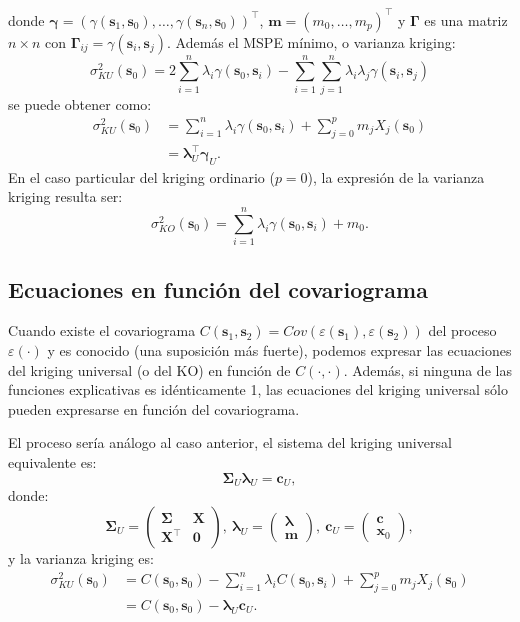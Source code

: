 \documentclass[
]{book}
\theoremstyle{break}
\theoremstyle{definition}
\theoremstyle{definition}
\theoremstyle{definition}
\theoremstyle{definition}
\theoremstyle{remark}
\begin{document}
donde \(\boldsymbol{\gamma}=\left( \gamma(\mathbf{s}_{1},\mathbf{s}_{0}), \ldots, \gamma(\mathbf{s}_{n} ,\mathbf{s}_{0})\right)^\top\), \(\mathbf{m}=\left(m_{0}, \ldots,m_{p} \right)^\top\) y \(\boldsymbol{\Gamma}\) es una matriz \(n\times n\) con \(\boldsymbol{\Gamma}_{ij} = \gamma(\mathbf{s}_{i}, \mathbf{s}_{j})\).
Además el MSPE mínimo, o varianza kriging:
\[\sigma_{KU}^{2} (\mathbf{s}_{0})=2\sum\limits_{i=1}^{n}\lambda_{i} 
\gamma(\mathbf{s}_{0},\mathbf{s}_{i}
)-\sum\limits_{i=1}^{n}\sum\limits_{j=1}^{n}\lambda_{i}  \lambda_{j}
\gamma(\mathbf{s}_{i},\mathbf{s}_{j} )\]
se puede obtener como:
\[\begin{aligned}
\sigma_{KU}^{2} (\mathbf{s}_{0})
& =\sum\limits_{i=1}^{n}\lambda_{i} \gamma(\mathbf{s}_{0},\mathbf{s}_{i})+\sum\limits_{j=0}^{p}m_{j} X_{j}
(\mathbf{s}_{0}) \\
& =\boldsymbol{\lambda}_{U}^\top \boldsymbol{\gamma}_{U}.
\end{aligned}\]
En el caso particular del kriging ordinario (\(p=0\)), la expresión de la varianza kriging resulta ser:
\[\sigma_{KO}^{2} (\mathbf{s}_{0})=\sum\limits_{i=1}^{n}\lambda_{i} 
\gamma(\mathbf{s}_{0},\mathbf{s}_{i})+m_{0}.\]

\subsection{Ecuaciones en función del covariograma}\label{ku-covariograma}

Cuando existe el covariograma \(C(\mathbf{s}_{1},\mathbf{s}_{2}) = Cov(\varepsilon(\mathbf{s}_{1}), \varepsilon(\mathbf{s}_{2}))\) del proceso \(\varepsilon(\cdot)\) y es conocido (una suposición más fuerte), podemos expresar las ecuaciones del kriging universal (o del KO) en función de \(C(\cdot,\cdot)\).
Además, si ninguna de las funciones explicativas es idénticamente 1, las ecuaciones del kriging universal sólo pueden expresarse en función del covariograma.

El proceso sería análogo al caso anterior, el sistema del kriging universal equivalente es:
\[\boldsymbol{\Sigma}_{U} \boldsymbol{\lambda}_{U} = \mathbf{c}_{U},\]
donde:
\[\boldsymbol{\Sigma}_{U} =\left( 
\begin{array}{lc}
\boldsymbol{\Sigma} & \mathbf{X} \\
\mathbf{X^\top } & \mathbf{0}
\end{array}
\right) ,\ 
\boldsymbol{\lambda}_{U} =\left( \begin{array}{c}
\boldsymbol{\lambda} \\
\mathbf{m}
\end{array} \right) ,\ 
\mathbf{c}_{U} =\left( \begin{array}{c}
\mathbf{c} \\
\mathbf{x}_0
\end{array} \right),\]
y la varianza kriging es:
\[\begin{aligned}
\sigma_{KU}^{2} (\mathbf{s}_{0}) 
& = C(\mathbf{s}_{0},\mathbf{s}_{0}) - \sum\limits_{i=1}^{n}\lambda_{i}  C(\mathbf{s}_{0},\mathbf{s}_{i}) + \sum\limits_{j=0}^{p}m_{j} X_{j}(\mathbf{s}_{0}) \\
& = C(\mathbf{s}_{0}, \mathbf{s}_{0}) - \boldsymbol{\lambda}_{U} \mathbf{c}_{U}.
\end{aligned}\]
\end{document}
